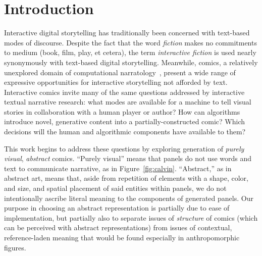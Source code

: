 \section{Introduction}

Interactive digital storytelling has traditionally been concerned with
text-based modes of discourse. Despite the fact that the word {\em fiction}
makes no commitments to medium (book, film, play, et cetera), the term {\em
interactive fiction} is used nearly synonymously with text-based digital
storytelling. Meanwhile, comics, a relatively unexplored domain of
computational narratology~\cite{mani2012computational}, present a wide
range of expressive opportunities for interactive storytelling not afforded
by text.  Interactive comics invite many of the same questions addressed by
interactive textual narrative research: what modes are available for a
machine to tell visual stories in collaboration with a human player or
author? How can algorithms introduce novel, generative content into a
partially-constructed comic?  Which decisions will the human and
algorithmic components have available to them?

This work begins to address these questions by exploring generation of {\em
purely visual}, {\em abstract} comics. ``Purely visual'' means that panels
do not use words and text to communicate narrative, as in
Figure~\ref{fig:calvin}. ``Abstract,'' as in abstract art, means that,
aside from repetition of elements with a shape, color, and size, and
spatial placement of said entities within panels, we do not intentionally
ascribe literal meaning to the components of generated panels. Our purpose
in choosing an abstract representation is partially due to ease of
implementation, but partially also to separate issues of {\em structure} of
comics (which can be perceived with abstract representations) from issues
of contextual, reference-laden meaning that would be found especially in
anthropomorphic figures. 


